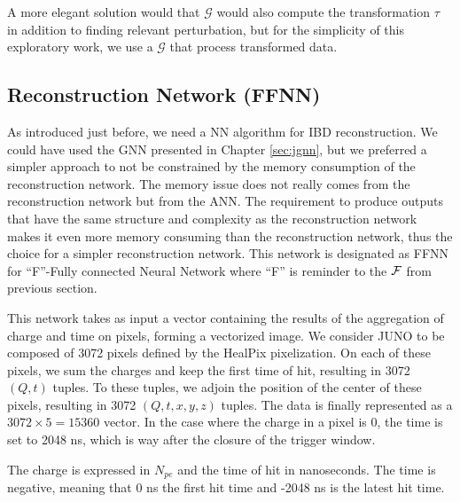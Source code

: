 \documentclass[../main.tex]{subfiles}
\begin{document}
A more elegant solution would that $\mathcal{G}$ would also compute the transformation $\tau$ in addition to finding relevant perturbation, but for the simplicity of this exploratory work, we use a $\mathcal{G}$ that process transformed data.

\subsection{Reconstruction Network (FFNN)}
\label{sec:janne:arch:reco}

As introduced just before, we need a NN algorithm for IBD reconstruction. We could have used the GNN presented in Chapter \ref{sec:jgnn}, but we preferred a simpler approach to not be constrained by the memory consumption of the reconstruction network. The memory issue does not really comes from the reconstruction network but from the ANN. The requirement to produce outputs that have the same structure and complexity as the reconstruction network makes it even more memory consuming than the reconstruction network, thus the choice for a simpler reconstruction network. This network is designated as FFNN for ``F''-Fully connected Neural Network where ``F'' is reminder to the ${\cal F}$ from previous section.

This network takes as input a vector containing the results of the aggregation of charge and time on pixels, forming a vectorized image. We consider JUNO to be composed of 3072 pixels defined by the HealPix \cite{gorski_healpix_2005} pixelization. On each of these pixels, we sum the charges and keep the first time of hit, resulting in 3072 $(Q,t)$ tuples. To these tuples, we adjoin the position of the center of these pixels, resulting in 3072 $(Q,t,x,y,z)$ tuples. The data is finally represented as a $3072 \times 5 = 15360$ vector. In the case where the charge in a pixel is 0, the time is set to 2048 ns, which is way after the closure of the trigger window.

The charge is expressed in $N_{pe}$ and the time of hit in nanoseconds. The time is negative, meaning that 0 ns the first hit time and -2048 ns is the latest hit time.
\end{document}
